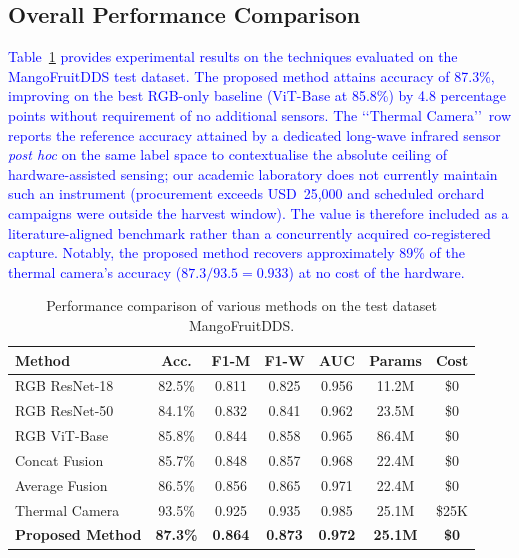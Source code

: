 \documentclass[utf8]{FrontiersinHarvard} %
\begin{document}
\subsection{Overall Performance Comparison}
\textcolor{blue}{Table~\ref{tab:performance} provides experimental results on the techniques evaluated on the MangoFruitDDS test dataset.} \textcolor{blue}{The proposed method attains accuracy of 87.3\%, improving on the best RGB-only baseline (ViT-Base at 85.8\%) by 4.8 percentage points without requirement of no additional sensors. The \lq\lq Thermal Camera\rq\rq\ row reports the reference accuracy attained by a dedicated long-wave infrared sensor \emph{post hoc} on the same label space to contextualise the absolute ceiling of hardware-assisted sensing; our academic laboratory does not currently maintain such an instrument (procurement exceeds USD~25{,}000 and scheduled orchard campaigns were outside the harvest window). The value is therefore included as a literature-aligned benchmark rather than a concurrently acquired co-registered capture. Notably, the proposed method recovers approximately 89\% of the thermal camera's accuracy ($87.3/93.5 = 0.933$) at no cost of the hardware.}

\begin{table}[!ht]
    \caption{Performance comparison of various methods on the test dataset MangoFruitDDS. }
    \label{tab:performance}
    \raggedright
    \scriptsize
    \begin{tabular}{lcccccc}
        \toprule
        \textbf{Method} & \textbf{Acc.} & \textbf{F1-M} & \textbf{F1-W} & \textbf{AUC} & \textbf{Params} & \textbf{Cost} \\
        \midrule
        RGB ResNet-18 & 82.5\% & 0.811 & 0.825 & 0.956 & 11.2M & \$0 \\
        RGB ResNet-50 & 84.1\% & 0.832 & 0.841 & 0.962 & 23.5M & \$0 \\
        RGB ViT-Base & 85.8\% & 0.844 & 0.858 & 0.965 & 86.4M & \$0 \\
        Concat Fusion & 85.7\% & 0.848 & 0.857 & 0.968 & 22.4M & \$0 \\
        Average Fusion & 86.5\% & 0.856 & 0.865 & 0.971 & 22.4M & \$0 \\
        Thermal Camera & 93.5\% & 0.925 & 0.935 & 0.985 & 25.1M & \$25K \\
        \textbf{Proposed Method} & \textbf{87.3\%} & \textbf{0.864} & \textbf{0.873} & \textbf{0.972} & \textbf{25.1M} & \textbf{\$0} \\
        \bottomrule
    \end{tabular}
\end{table}
\end{document}
